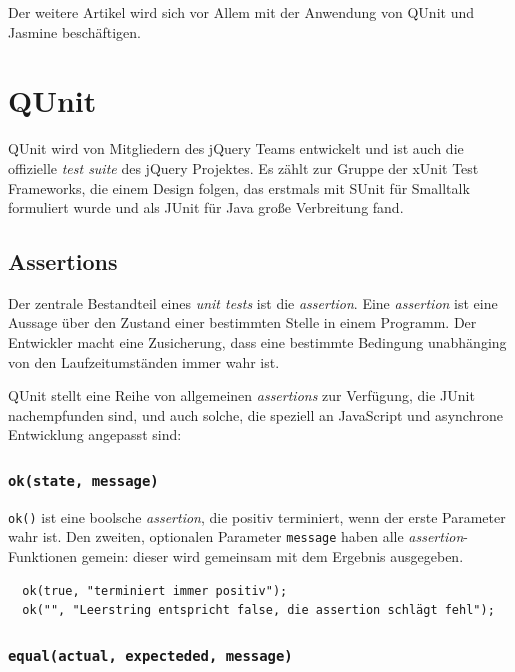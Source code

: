 \documentclass[11pt, a4paper]{article}
\begin{document}
Der weitere Artikel wird sich vor Allem mit der Anwendung von QUnit und Jasmine
beschäftigen.

\section{QUnit}

QUnit\cite{zaefferer_qunit_2011} wird von Mitgliedern des jQuery
Teams\cite{resig_jquery_2011} entwickelt und ist auch die offizielle
\emph{test suite} des jQuery Projektes. Es zählt zur Gruppe der
xUnit Test Frameworks\cite{fowler_xunit_2010}, die einem Design folgen,
das erstmals mit SUnit\cite{beck_simple_1994} für Smalltalk formuliert
wurde und als JUnit\cite{gamma_junit_2011} für Java große Verbreitung fand.

\subsection{Assertions}

Der zentrale Bestandteil eines \emph{unit tests} ist die \emph{assertion}. Eine
\emph{assertion} ist eine Aussage über den Zustand einer bestimmten Stelle in
einem Programm\cite{wikipedia_assertion_2011}. Der Entwickler macht eine
Zusicherung, dass eine bestimmte Bedingung unabhänging von den Laufzeitumständen
immer wahr ist.

QUnit stellt eine Reihe von allgemeinen \emph{assertions} zur Verfügung,
die JUnit nachempfunden sind, und auch solche, die speziell an JavaScript
und asynchrone Entwicklung angepasst sind\cite{zaefferer_qunit_2011}:

\subsubsection*{\texttt{ok(state, message)}}

\texttt{ok()} ist eine boolsche \emph{assertion}, die positiv terminiert, wenn der
erste Parameter wahr ist. Den zweiten, optionalen Parameter \texttt{message} haben alle
\emph{assertion}-Funktionen gemein: dieser wird gemeinsam mit dem Ergebnis
ausgegeben.

\begin{verbatim}
  ok(true, "terminiert immer positiv");
  ok("", "Leerstring entspricht false, die assertion schlägt fehl");
\end{verbatim}

\subsubsection*{\texttt{equal(actual, expecteded, message)}}
\end{document}
